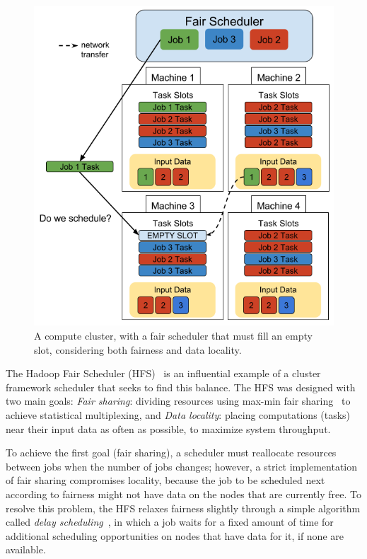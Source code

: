 \begin{figure}[t]
        \includegraphics[width=\linewidth]{./fig1.png}
        \caption{A compute cluster, with a fair scheduler that must fill an empty slot, considering both fairness and data locality.}
        \label{fig:cluster}
    \endminipage
\end{figure}

The Hadoop Fair Scheduler (HFS)~\cite{Zaharia:EECS} is an influential example of a cluster framework 
scheduler that seeks to find this balance. The HFS was designed with two main goals: 
\textit{Fair sharing}: dividing resources using max-min fair sharing~\cite{Zaharia2008} to achieve 
statistical multiplexing, and 
\textit{Data locality}: placing computations (tasks) near their input data as often as
possible, to maximize system throughput. 

To achieve the first goal (fair sharing), a scheduler must reallocate resources between 
jobs when the number of jobs changes; however, a strict implementation of fair sharing 
compromises locality, because the job to be scheduled next according to fairness might not
have data on the nodes that are currently free. To resolve this problem, the HFS relaxes 
fairness slightly through a simple algorithm called 
\textit{delay scheduling}~\cite{Zaharia2010}, in which a 
job waits for a fixed amount of time for additional scheduling opportunities on nodes 
that have data for it, if none are available.

